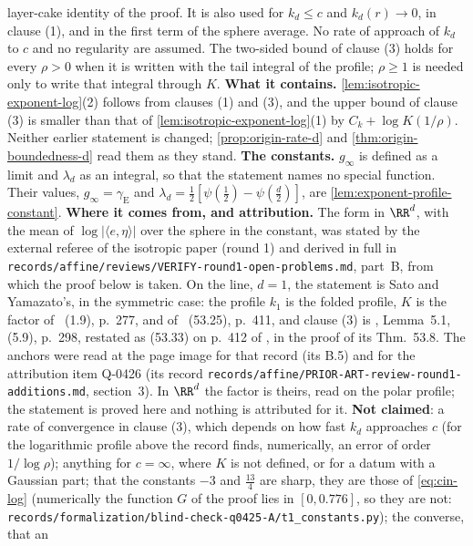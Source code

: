 \begin{proposition}
{layer-cake identity of the proof. It is also used for $k_d \le c$ and $k_d(r) \to 0$, in clause
(1), and in the first term of the sphere average. No rate of approach of $k_d$ to $c$ and no
regularity are assumed. The two-sided bound of clause (3) holds for every $\rho > 0$ when it is
written with the tail integral of the profile; $\rho \ge 1$ is needed only to write that integral
through $K$. \textbf{What it contains.}
\ref{lem:isotropic-exponent-log}(2) follows from clauses (1) and (3), and the upper bound of
clause (3) is smaller than that of \ref{lem:isotropic-exponent-log}(1) by $C_k + \log K(1/\rho)$.
Neither earlier statement is changed; \ref{prop:origin-rate-d} and
\ref{thm:origin-boundedness-d} read them as they stand. \textbf{The constants.} $g_\infty$ is
defined as a limit and $\lambda_d$ as an integral, so that the statement names no special
function. Their values, $g_\infty = \gamma_{\mathrm E}$ and
$\lambda_d = \tfrac12[\psi(\tfrac12) - \psi(\tfrac d2)]$, are
\ref{lem:exponent-profile-constant}. \textbf{Where it comes from, and attribution.} The form in
$\RR^d$, with the mean of $\log|\langle e,\eta\rangle|$ over the sphere in the constant, was
stated by the external referee of the isotropic paper (round 1) and derived in full in
\texttt{records/affine/reviews/VERIFY-round1-open-problems.md}, part~B, from which the proof below
is taken. On the line, $d = 1$, the statement is Sato and Yamazato's, in the symmetric case: the
profile $k_1$ is the folded profile, $K$ is the factor of ~(1.9),
p.~277, and of ~(53.25), p.~411, and clause (3) is
, Lemma~5.1, (5.9), p.~298, restated as (53.33) on p.~412 of
, in the proof of its Thm.~53.8. The anchors were read at the page image for
that record (its B.5) and for the attribution item Q-0426 (its record
\texttt{records/affine/PRIOR-ART-review-round1-additions.md}, section~3). In $\RR^d$ the
factor is theirs, read on the polar profile; the statement is proved here and nothing is
attributed for it. \textbf{Not claimed}: a rate of
convergence in clause (3), which depends on how fast $k_d$ approaches $c$ (for the logarithmic
profile above the record finds, numerically, an error of order $1/\log\rho$); anything for
$c = \infty$, where $K$ is not defined, or for a datum with a Gaussian part; that the constants
$-3$ and $\tfrac{13}{4}$ are sharp, they are those of \ref{eq:cin-log} (numerically the function
$G$ of the proof lies in $[0, 0.776]$, so they are not:
\texttt{records/formalization/blind-check-q0425-A/t1\_constants.py}); the converse, that an
}
\end{proposition}
